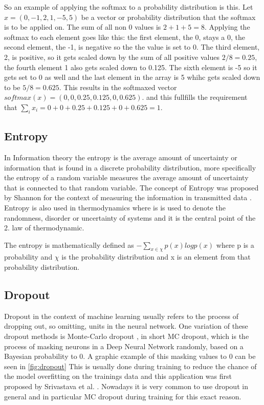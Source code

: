 So an example of applying the softmax to a probability distribution is this. Let $x= (0, -1, 2, 1, -5, 5)$ be a vector or probability distribution that the softmax is to be applied on. The sum of all non 0 values is $2+1+5=8$. Applying the softmax to each element goes like this: the first element, the 0, stays a 0, the second element, the -1, is negative so the the value is set to 0. The third element, 2, is positive, so it gets scaled down by the sum of all positive values $2/8=0.25$, the fourth element 1 also gets scaled down to 0.125. The sixth element is -5 so it gets set to 0 as well and the last element in the array is 5 whihc gets scaled down to be $5/8=0.625$.
This results in the softmaxed vector $softmax(x)=(0,0,0.25,0.125,0,0.625)$. and this fullfills the requirement that $\sum_ix_i = 0+0+0.25+0.125+0+0.625= 1$. \cite[chapter~5.3.1]{jm3}

\subsection{Entropy}
\label{entropy}
In Information theory the entropy is the average amount of uncertainty or information that is found in a discrete probability distribution, more specifically the entropy of a random variable measures the average amount of uncertainty that is connected to that random variable.
The concept of Entropy was proposed by Shannon for the context of measuring the information in transmitted data \cite{shannonentropy}. Entropy is also used in thermodynamics where is is used to denote the randomness, disorder or uncertainty of systems and it is the central point of the 2. law of thermodynamic.

The entropy is mathematically defined as $- \sum_{x\in \chi} p(x) log p(x)$ where p is a probability and $\chi$ is the probability distribution and x is an element from that probability distribution.


\subsection{Dropout}
Dropout in the context of machine learning usually refers to the process of dropping out, so omitting, units in the neural network. 
One variation of these dropout methods is Monte-Carlo dropout \cite{gal2016dropoutbayesianapproximationrepresenting}, in short MC dropout, which is the process of masking neurons in a Deep Neural Network randomly, based on a Bayesian probability to 0. A graphic example of this masking values to 0 can be seen in \autoref{fig:dropout}
This is usually done during training to reduce the chance of the model overfitting on the trainings data and this application was first proposed by Srivastava et al. \cite{JMLR:v15:srivastava14a}. 
Nowadays it is very common to use dropout in general and in particular MC dropout during training for this exact reason.

